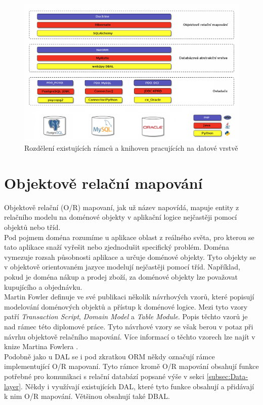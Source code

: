 \documentclass[ing,male,java,dept456]{diploma}						%
\begin{document}
\begin{figure}[h!]
    \centering
    \includegraphics[width=150mm]{layers.png}
    \caption{Rozdělení existujících rámců a knihoven pracujících na datové vrstvě}
    \label{fig:Layers}
\end{figure}

\section{Objektově relační mapování}
\label{sec:ORM}

Objektově relační (O/R) mapovaní, jak už název napovídá, mapuje entity z relačního modelu na doménové objekty v aplikační logice nejčastěji pomocí objektů nebo tříd. \\
Pod pojmem doména rozumíme u aplikace oblast z reálného světa, pro kterou se tato aplikace snaží vyřešit nebo zjednodušit specifický problém. Doména vymezuje rozsah působnosti aplikace a určuje doménové objekty. Tyto objekty se v objektově orientovaném jazyce modelují nejčastěji pomocí tříd. Například, pokud je doména nákup a prodej zboží, za doménové objekty lze považovat kupujícího a objednávku. \\
Martin Fowler definuje ve své publikaci několik návrhových vzorů, které popisují modelování doménových objektů a přístup k doménové logice. Mezi tyto vzory patří \textit{Transaction Script}, \textit{Domain Model} a \textit{Table Module}. Popis těchto vzorů je nad rámec této diplomové práce. Tyto návrhové vzory se však berou v potaz při návrhu objektově relačního mapování. Více informací o těchto vzorech lze najít v knize Martina Fowlera \cite{fowler}.\\
Podobně jako u DAL se i pod zkratkou ORM někdy označují rámce implementující O/R mapovaní. Tyto rámce kromě O/R mapování obsahují funkce potřebné pro komunikaci s relační databází popsané výše v sekci \ref{subsec:Data-layer}. Někdy i využívají existujících DAL, které tyto funkce obsahují a přidávají k nim O/R mapování. Většinou obsahují také DBAL. \\
\end{document}
